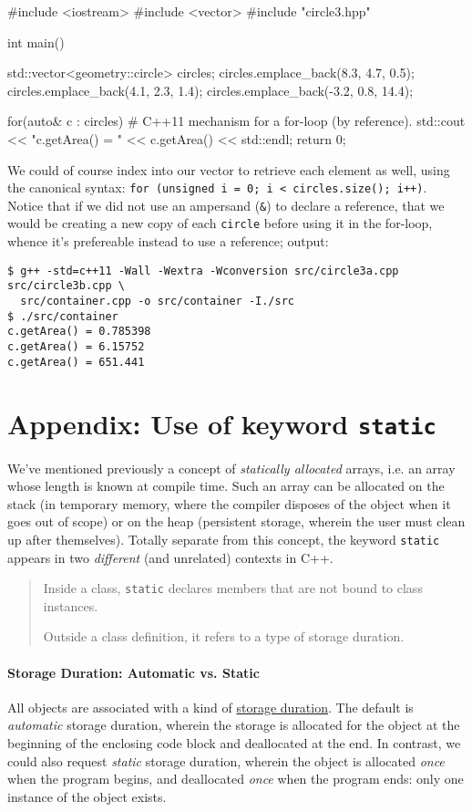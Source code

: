 \documentclass[12pt,letterpaper,twoside]{article}
\begin{document}
\begin{cpp}
#include <iostream>
#include <vector>
#include "circle3.hpp"

int main() {
  std::vector<geometry::circle> circles;
  circles.emplace_back(8.3, 4.7, 0.5);
  circles.emplace_back(4.1, 2.3, 1.4);
  circles.emplace_back(-3.2, 0.8, 14.4);

  for(auto& c : circles)   # C++11 mechanism for a for-loop (by reference).
    std::cout << "c.getArea() = " << c.getArea() << std::endl;
  return 0;
}
\end{cpp}

We could of course index into our vector to retrieve each element as well,
using the canonical syntax: 
\texttt{for (unsigned i = 0; i < circles.size(); i++)}. Notice that if we did
not use an ampersand (\texttt{\&}) to declare a reference, 
that we would be creating a new
copy of each \texttt{circle} before using it in the for-loop, whence it's 
prefereable instead to use a reference;
output:

\begin{verbatim}
$ g++ -std=c++11 -Wall -Wextra -Wconversion src/circle3a.cpp src/circle3b.cpp \ 
  src/container.cpp -o src/container -I./src
$ ./src/container 
c.getArea() = 0.785398
c.getArea() = 6.15752
c.getArea() = 651.441
\end{verbatim}

\section{Appendix: Use of keyword \texttt{static}} We've mentioned 
previously a concept
of \emph{statically allocated} arrays, i.e. an array whose length is known at 
compile time. Such an array can be allocated on the stack 
(in temporary memory, where the compiler disposes of the object when 
it goes out of scope) 
or on the heap (persistent storage, wherein the user must clean up after 
themselves). Totally separate from this concept, the keyword \texttt{static} 
appears in two \emph{different} (and unrelated) contexts in C++.

\begin{quotation}   Inside a class, \texttt{static} declares members that are 
  not bound to class instances.

  Outside a class definition, it refers to a type of storage duration. \end{quotation}

\paragraph{Storage Duration: Automatic vs. Static} 
All objects are associated with a kind of 
\href{https://en.cppreference.com/w/cpp/language/storage_duration}
{storage duration}. The default is \emph{automatic} storage duration, wherein the storage is allocated for the object at the beginning of the enclosing code block and deallocated at the end. In contrast, we could also request \emph{static} storage duration, wherein the object is allocated \emph{once} when the program begins, and deallocated \emph{once} when the program ends: only one instance of the object exists.
\end{document}

